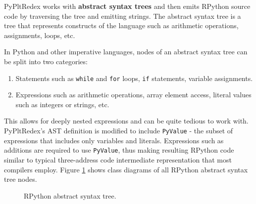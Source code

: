 PyPltRedex works with \textbf{abstract syntax trees} and then emits RPython source code by traversing the tree and emitting strings. The abstract syntax tree is a tree that represents constructs of the language such as arithmetic operations, assignments, loops, etc.

In Python and other imperative languages, nodes of an abstract syntax tree can be split into two categories:

\begin{enumerate}
\item
Statements such as \texttt{while} and \texttt{for} loops, \texttt{if} statements, variable assignments.
\item
Expressions such as arithmetic operations, array element access, literal values such as integers or strings, etc.
\end{enumerate}

This allows for deeply nested expressions and can be quite tedious to work with. PyPltRedex's AST definition is modified to include \texttt{PyValue} - the subset of expressions that includes only variables and literals. Expressions such as additions are required to use \texttt{PyValue}, thus making resulting RPython code similar to typical three-address code intermediate representation that most compilers employ. Figure \ref{class-diagram-rpython} shows class diagrams of all RPython abstract syntax tree nodes.

\begin{figure}[ht]
	\centering
	\caption{RPython abstract syntax tree.}
\label{class-diagram-rpython}
\end{figure}

